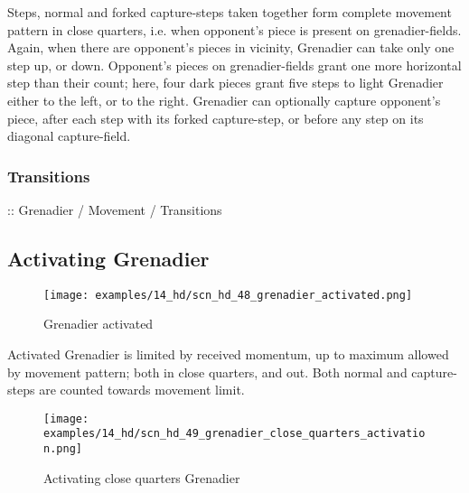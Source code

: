\vspace*{-0.5\baselineskip}
Steps, normal and forked capture-steps taken together form complete movement pattern
in close quarters, i.e. when opponent's piece is present on grenadier-fields. \newline
\indent
Again, when there are opponent's pieces in vicinity, Grenadier can take only one step
up, or down. Opponent's pieces on grenadier-fields grant one more horizontal step than
their count; here, four dark pieces grant five steps to light Grenadier either to the
left, or to the right. \newline
\indent
Grenadier can optionally capture opponent's piece, after each step with its forked
capture-step, or before any step on its diagonal capture-field.

\clearpage %

\subsubsection*{Transitions}
\label{sec:Hemera's Dawn/Grenadier/Movement/Transitions}

\TODO :: Grenadier / Movement / Transitions

\clearpage %

\subsection*{Activating Grenadier}
\label{sec:Hemera's Dawn/Grenadier/Activating Grenadier}

\vspace*{-0.7\baselineskip}
\noindent
\begin{wrapfigure}[7]{l}{0.4\textwidth}
\centering
\texttt{[image: examples/14\_hd/scn\_hd\_48\_grenadier\_activated.png]}
\vspace*{-0.5\baselineskip}
\caption{Grenadier activated}
\label{fig:scn_hd_48_grenadier_activated}
\end{wrapfigure}
Activated Grenadier is limited by received momentum, up to maximum allowed by movement
pattern; both in close quarters, and out. Both normal and capture-steps are counted
towards movement limit.

\vspace*{0.4\baselineskip}
\noindent
\begin{figure}[!h]
\texttt{[image: examples/14\_hd/scn\_hd\_49\_grenadier\_close\_quarters\_activation.png]}
\vspace*{-1.4\baselineskip}
\caption{Activating close quarters Grenadier}
\label{fig:scn_hd_49_grenadier_close_quarters_activation}
\end{figure}

